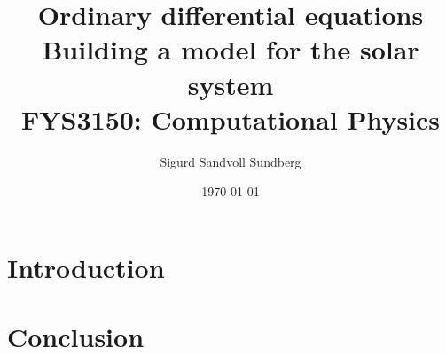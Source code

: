 \documentclass[%
reprint,
nofootinbib,
amsmath,amssymb,
aps,
]{revtex4-1}
\begin{document}
	
\title{Ordinary differential equations\\
	\normalsize{Building a model for the solar system} \\
	\hrulefill\small{ FYS3150: Computational Physics }\hrulefill}

\author{Sigurd Sandvoll Sundberg}

%

\date{\today}

\begin{abstract}%

\end{abstract}

\maketitle 

\section{Introduction} %

\section{Conclusion} %
\appendix


\end{document}
